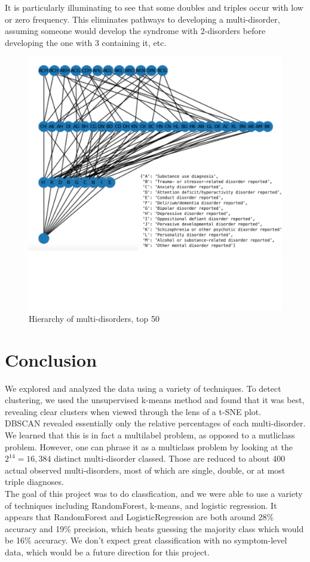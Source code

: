 \documentclass[11pt]{amsart}
\begin{document}
It is particularly illuminating to see that some doubles and triples occur with low or zero frequency. This eliminates pathways to developing a multi-disorder, assuming someone would develop the syndrome with 2-disorders before developing the one with 3 containing it, etc.

\begin{figure}[h]
\caption{Hierarchy of multi-disorders, top 50}
\centering
\includegraphics[width=1.0\textwidth]{disorder_hierarchy_top50_labeled_legend.png}
\end{figure}

\section{Conclusion}

We explored and analyzed the data using a variety of techniques. To detect clustering, we used the unsupervised k-means method and found that it was best, revealing clear clusters when viewed through the lens of a t-SNE plot. \\

DBSCAN revealed essentially only the relative percentages of each multi-disorder. We learned that this is in fact a multilabel problem, as opposed to a mutliclass problem. However, one can phrase it as a multiclass problem by looking at the $2^14=16,384$ distinct multi-disorder classed. Those are reduced to about 400 actual observed multi-disorders, most of which are single, double, or at most triple diagnoses.  \\

The goal of this project was to do classfication, and we were able to use a variety of techniques including RandomForest, k-means, and logistic regression. It appears that RandomForest and LogisticRegression are both around 28\% accuracy and 19\% precision, which beats guessing the majority class which would be 16\% accuracy. We don't expect great classification with no symptom-level data, which would be a future direction for this project.
\end{document}

